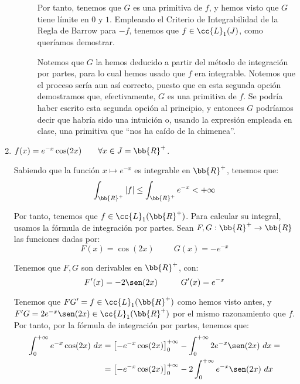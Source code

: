 \begin{ejercicio}
\begin{enumerate}
\begin{description}
            Por tanto, tenemos que $G$ es una primitiva de $f$, y hemos visto que $G$ tiene límite en $0$ y $1$.
            Empleando el Criterio de Integrabilidad de la Regla de Barrow para $-f$, tenemos que $f\in \cc{L}_1(J)$, como queríamos demostrar.

            \begin{observacion}
                Notemos que $G$ la hemos deducido a partir del método de integración por partes, para lo cual hemos usado que $f$ era integrable.
                Notemos que el proceso sería aun así correcto, puesto que en esta segunda opción demostramos
                que, efectivamente, $G$ es una primitiva de $f$. Se podría haber escrito esta segunda opción al principio,
                y entonces $G$ podríamos decir que habría sido una intuición o, usando la 
                expresión empleada en clase, una primitiva que ``nos ha caído de la chimenea''.
            \end{observacion}
        \end{description}

        \item $f(x)=e^{-x}\cos(2x) \qquad \forall x\in J=\bb{R}^+$.
        
        Sabiendo que la función $x\mapsto e^{-x}$ es integrable en $\bb{R}^+$, tenemos que:
        \begin{equation*}
            \int_{\bb{R}^+} |f| \leq \int_{\bb{R}^+} e^{-x} < +\infty
        \end{equation*}

        Por tanto, tenemos que $f\in \cc{L}_1(\bb{R}^+)$. Para calcular su integral, usamos la fórmula de integración por partes.
        Sean $F,G:\bb{R}^+\to \bb{R}$ las funciones dadas por:
        \begin{equation*}
            F(x) = \cos(2x) \hspace{1cm} G(x) = -e^{-x}
        \end{equation*}

        Tenemos que $F,G$ son derivables en $\bb{R}^+$, con:
        \begin{equation*}
            F'(x) = -2\sen(2x) \hspace{1cm} G'(x) = e^{-x}
        \end{equation*}

        Tenemos que $FG' = f\in \cc{L}_1(\bb{R}^+)$ como hemos visto antes, y $F'G = 2e^{-x}\sen(2x)\in \cc{L}_1(\bb{R}^+)$ por el mismo razonamiento que $f$.
        Por tanto, por la fórmula de integración por partes, tenemos que:
        \begin{align*}
            \int_0^{+\infty} e^{-x}\cos(2x)~dx
            &= \left[-e^{-x}\cos(2x)\right]_0^{+\infty} - \int_0^{+\infty} 2e^{-x}\sen(2x)~dx
            =\\&= \left[-e^{-x}\cos(2x)\right]_0^{+\infty} - 2\int_0^{+\infty} e^{-x}\sen(2x)~dx
        \end{align*}


\end{enumerate}
\end{ejercicio}
